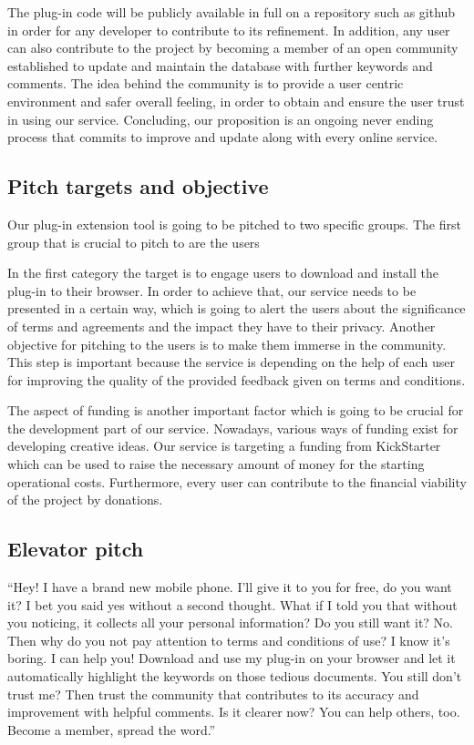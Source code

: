 The plug-in code will be publicly available in full on a repository such as 
github in order for any developer to contribute to its refinement. In addition, 
any user can also contribute to the project by becoming a member of an open 
community established to update and maintain the database with further keywords 
and comments. The idea behind the community is to provide a user centric 
environment and safer overall feeling, in order to obtain and ensure the user 
trust in using our service. Concluding, our proposition is an ongoing never 
ending process that commits to improve and update along with every online 
service. 

\subsection{Pitch targets and objective}

Our plug-in extension tool is going to be pitched to two specific groups. The 
first group that is crucial to  pitch to are the users  

In the first category the target is to engage users to download and install the 
plug-in to their browser. In order to achieve that, our service needs to be 
presented in a certain way, which is going to alert the users about the 
significance of terms and agreements and the impact they have to their privacy. 
Another objective for pitching to the users is to make them immerse in the 
community. This step is important because the service is depending on the help 
of each user for improving the quality of the provided feedback given on terms 
and conditions.

The aspect of funding is another important factor which is going to be crucial 
for the development part of our service. Nowadays, various ways of funding exist 
for developing creative ideas. Our service is targeting a funding from 
KickStarter which can be used to raise the necessary amount of money for the 
starting operational costs. Furthermore, every user can contribute to the 
financial viability of the project by donations. 

\subsection{Elevator pitch}

``Hey! I have a brand new mobile phone. I’ll give it to you for free, do you 
want it? I bet you said yes without a second thought. What if I told you that 
without you noticing, it collects all your personal information? Do you still 
want it? No. Then why do you not pay attention to terms and conditions of use? I 
know it's boring. I can help you! Download and use my plug-in on your browser 
and let it automatically highlight the keywords on those tedious documents. You 
still don't trust me? Then trust the community that contributes to its accuracy 
and improvement with helpful comments. Is it clearer now? You can help others, 
too. Become a member, spread the word.''
